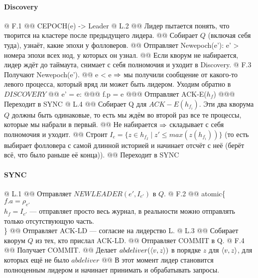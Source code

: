 \paragraph{Discovery}
\begin{el}[ul]
@ F.1 
@@ CEPOCH(e) -> Leader 
@ L.2 
@@ Лидер пытается понять, что творится на кластере после предыдущего лидера.
@@ Собирает $Q$ (включая себя туда), узнаёт, какие эпохи у фолловеров.
@@ Отправляет Newepoch(e'): e' > номера эпохи всех нод, у которых он узнал.
@@ Если кворум не набирается, лидер ждёт до таймаута, снимает с себя полномочия и уходит в Discovery.
@ F.3 Получают Newepoch(e').
@@ e < e $\Rightarrow$ мы получили сообщение от какого-то левого процесса, который вряд ли может быть лидером. Уходим обратно в $DISCOVERY$
@@ e' = e: 
@@@ f.p = e
@@@ Отправляет ACK-E($h_f$)
@@@ Переходит в SYNC
@ L.4 
@@ Собирает Q для $ACK-E(h_{f_i})$. Эти два кворума $Q$ должны быть одинаковые, то есть мы ждём во второй раз все те процессы, которые мы набрали в первый.
@@ Не набирается $\Rightarrow$ складывает с себя полномочия и уходит.
@@ Строит $I_e = \{z \in h_{f_I} \mid z' \le max(z(h_{f_i}))\}$ (то есть выбирает фолловера с самой длинной историей и начинает отсчёт с неё (берёт всё, что было раньше её конца)).
@@ Переходит в SYNC
\end{el}

\paragraph{SYNC}
\begin{el}[ul]
@ L.1 
@@ Отправляет $NEWLEADER(e', I_{e'})$ в $Q$.
@ F.2 
@@ atomic\{\\
$f.a = \rho_{e'}$\\
$h_f = I_{e'}$ --- отправляет просто весь журнал, в реальности можно отправлять только отсутствующую часть.\\
\}
@@ Отправляет ACK-LD --- согласие на лидерство L.
@ L.3 
@@ Собирает кворум $Q$ из тех, кто прислал ACK-LD.
@@ Отправляет COMMIT в Q.
@ F.4
@@ Получает COMMIT.
@@ Делает $abdeliver(\langle v, z\rangle)$ в порядке $z$ для $\langle v, z\rangle$, для которых ещё не было $abdeliver$
@@ В этот момент лидер становится полноценным лидером и начинает принимать и обрабатывать запросы.
\end{el}

